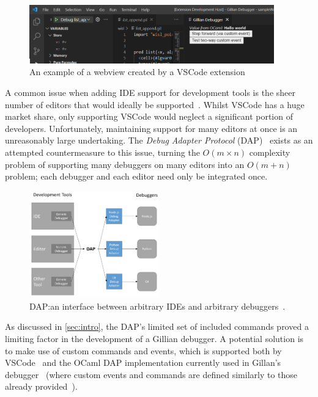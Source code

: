 \begin{figure}
  \center{}
  \includegraphics[width=400px]{img/webview-example.png}
  \caption{An example of a webview created by a VSCode extension}%
  \label{fig:webview-example}
\end{figure}


A common issue when adding IDE support for development tools is the sheer
number of editors that would ideally be supported~\cite{magpiebridge}. Whilst
VSCode has a huge market share, only supporting VSCode would neglect a
significant portion of developers. Unfortunately, maintaining support for many
editors at once is an unreasonably large undertaking. The \textit{Debug Adapter
Protocol} (DAP)~\cite{dap} exists as an attempted countermeasure to this issue,
turning the $O(m \times n)$ complexity problem of supporting many debuggers on
many editors into an $O(m + n)$ problem; each debugger and each editor need only
be integrated once.

\begin{figure}[!t]
  \centering
  \includegraphics[width=0.5\textwidth]{img/dap-diagram.png}
  \caption{
    DAP:\@ an interface between arbitrary IDEs and
    arbitrary debuggers~\cite{dap}.
  }\label{fig:dap-diagram}
\end{figure}

As discussed in \autoref{sec:intro}, the DAP's limited set of
included commands proved a limiting factor in the development of a Gillian
debugger. A potential solution is to make use of custom commands and events,
which is supported both by
VSCode~\cite{vscode-dap-custom-request, vscode-dap-custom-event} and the OCaml
DAP implementation currently used in Gillan's debugger~\cite{ocaml-dap} (where
custom events and commands are defined similarly to those already
provided~\cite{ocaml-dap-custom}).


